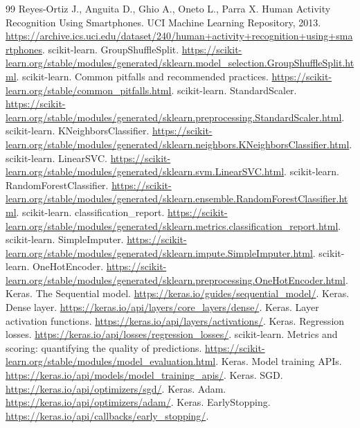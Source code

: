 \clearpage{}
\begingroup\small\singlespacing
\begin{thebibliography}{99}
 Reyes-Ortiz J., Anguita D., Ghio A., Oneto L., Parra X. Human Activity Recognition Using Smartphones. UCI Machine Learning Repository, 2013.
\url{https://archive.ics.uci.edu/dataset/240/human+activity+recognition+using+smartphones}.
 scikit-learn. GroupShuffleSplit.
\url{https://scikit-learn.org/stable/modules/generated/sklearn.model_selection.GroupShuffleSplit.html}.
 scikit-learn. Common pitfalls and recommended practices.
\url{https://scikit-learn.org/stable/common_pitfalls.html}.
 scikit-learn. StandardScaler.
\url{https://scikit-learn.org/stable/modules/generated/sklearn.preprocessing.StandardScaler.html}.
 scikit-learn. KNeighborsClassifier.
\url{https://scikit-learn.org/stable/modules/generated/sklearn.neighbors.KNeighborsClassifier.html}.
 scikit-learn. LinearSVC.
\url{https://scikit-learn.org/stable/modules/generated/sklearn.svm.LinearSVC.html}.
 scikit-learn. RandomForestClassifier.
\url{https://scikit-learn.org/stable/modules/generated/sklearn.ensemble.RandomForestClassifier.html}.
 scikit-learn. classification\_report.
\url{https://scikit-learn.org/stable/modules/generated/sklearn.metrics.classification_report.html}.
 scikit-learn. SimpleImputer.
\url{https://scikit-learn.org/stable/modules/generated/sklearn.impute.SimpleImputer.html}.
 scikit-learn. OneHotEncoder.
\url{https://scikit-learn.org/stable/modules/generated/sklearn.preprocessing.OneHotEncoder.html}.
 Keras. The Sequential model.
\url{https://keras.io/guides/sequential_model/}.
 Keras. Dense layer.
\url{https://keras.io/api/layers/core_layers/dense/}.
 Keras. Layer activation functions.
\url{https://keras.io/api/layers/activations/}.
 Keras. Regression losses.
\url{https://keras.io/api/losses/regression_losses/}.
 scikit-learn. Metrics and scoring: quantifying the quality of predictions.
\url{https://scikit-learn.org/stable/modules/model_evaluation.html}.
 Keras. Model training APIs.
\url{https://keras.io/api/models/model_training_apis/}.
 Keras. SGD.
\url{https://keras.io/api/optimizers/sgd/}.
 Keras. Adam.
\url{https://keras.io/api/optimizers/adam/}.
 Keras. EarlyStopping.
\url{https://keras.io/api/callbacks/early_stopping/}.

\end{thebibliography}
